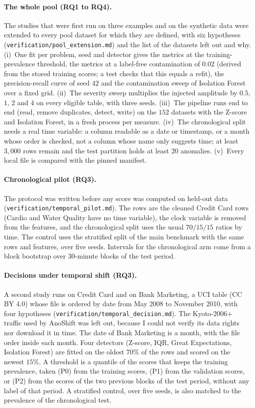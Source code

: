 \documentclass[conference]{IEEEtran}
\begin{document}
\paragraph{The whole pool (RQ1 to RQ4).} The studies that were first run on three examples and on
the synthetic data were extended to every pool dataset for which they are defined, with six
hypotheses (\texttt{verification/pool\_extension.md}) and the list of the datasets left out and why.
(i)~One fit per problem, seed and detector gives the metrics at the training-prevalence threshold, the
metrics at a label-free contamination of $0.02$ (derived from the stored training scores; a test checks
that this equals a refit), the precision-recall curve of seed $42$ and the contamination sweep of
Isolation Forest over a fixed grid. (ii)~The severity sweep multiplies the injected amplitude by $0.5$,
$1$, $2$ and $4$ on every eligible table, with three seeds. (iii)~The pipeline runs end to end
(read, remove duplicates, detect, write) on the $152$ datasets with the Z-score and Isolation Forest,
in a fresh process per measure. (iv)~The chronological split needs a real time variable: a column
readable as a date or timestamp, or a month whose order is checked, not a column whose name only
suggests time; at least $3{,}000$ rows remain and the test partition holds at least $20$ anomalies.
(v)~Every local file is compared with the pinned manifest.

\paragraph{Chronological pilot (RQ3).} The protocol was written before any score was computed on
held-out data (\texttt{verification/temporal\_pilot.md}). The rows are the cleaned Credit Card rows
(Cardio and Water Quality have no time variable), the clock variable is removed from the features,
and the chronological split uses the usual $70/15/15$ ratios by time. The control uses the stratified
split of the main benchmark with the same rows and features, over five seeds. Intervals for the
chronological arm come from a block bootstrap over $30$-minute blocks of the test period.

\paragraph{Decisions under temporal shift (RQ3).} A second study runs on Credit Card and on Bank
Marketing, a UCI table (CC BY 4.0) whose file is ordered by date from May 2008 to November 2010,
with four hypotheses (\texttt{verification/temporal\_decision.md}). The Kyoto-2006+ traffic used by
AnoShift was left out, because I could not verify its data rights nor download it in time. The
date of Bank Marketing is a month, with the file order inside each month. Four detectors (Z-score,
IQR, Great Expectations, Isolation Forest) are fitted on the oldest $70\%$ of the rows and scored on
the newest $15\%$. A threshold is a quantile of the scores that keeps the training prevalence, taken
(P0) from the training scores, (P1) from the validation scores, or (P2) from the scores of the two
previous blocks of the test period, without any label of that period. A stratified control, over five
seeds, is also matched to the prevalence of the chronological test.
\end{document}
